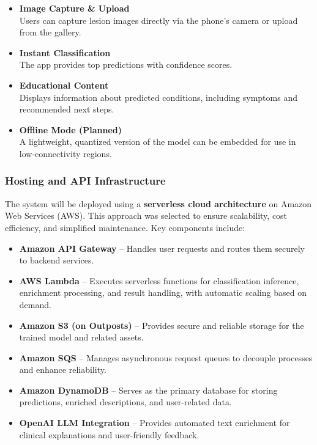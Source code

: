 \documentclass[
  12pt,
  oneside]{article}
\providecommand{\tightlist}{%
  \setlength{\itemsep}{0pt}\setlength{\parskip}{0pt}}
\begin{document}
\begin{itemize}
\tightlist
\item
  \textbf{Image Capture \& Upload}\\
  Users can capture lesion images directly via the phone's camera or
  upload from the gallery.
\item
  \textbf{Instant Classification}\\
  The app provides top predictions with confidence scores.
\item
  \textbf{Educational Content}\\
  Displays information about predicted conditions, including symptoms
  and recommended next steps.
\item
  \textbf{Offline Mode (Planned)}\\
  A lightweight, quantized version of the model can be embedded for use
  in low-connectivity regions.
\end{itemize}

\subsubsection{Hosting and API
Infrastructure}\label{hosting-and-api-infrastructure}

The system will be deployed using a \textbf{serverless cloud
architecture} on Amazon Web Services (AWS). This approach was selected
to ensure scalability, cost efficiency, and simplified maintenance. Key
components include:

\begin{itemize}
\tightlist
\item
  \textbf{Amazon API Gateway} -- Handles user requests and routes them
  securely to backend services.\\
\item
  \textbf{AWS Lambda} -- Executes serverless functions for
  classification inference, enrichment processing, and result handling,
  with automatic scaling based on demand.\\
\item
  \textbf{Amazon S3 (on Outposts)} -- Provides secure and reliable
  storage for the trained model and related assets.\\
\item
  \textbf{Amazon SQS} -- Manages asynchronous request queues to decouple
  processes and enhance reliability.\\
\item
  \textbf{Amazon DynamoDB} -- Serves as the primary database for storing
  predictions, enriched descriptions, and user-related data.\\
\item
  \textbf{OpenAI LLM Integration} -- Provides automated text enrichment
  for clinical explanations and user-friendly feedback.
\end{itemize}
\end{document}
